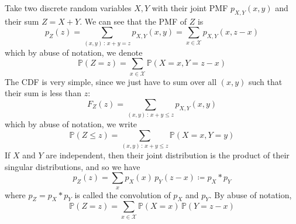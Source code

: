     \begin{definition}
      Take two discrete random variables $X, Y$ with their joint PMF $p_{X, Y} (x, y)$ and their sum $Z = X + Y$. We can see that the PMF of $Z$ is 
      \begin{equation}
        p_Z (z) = \sum_{(x, y) \,:\, x + y = z} p_{X, Y} (x, y) = \sum_{x \in \mathcal{X}} p_{X, Y} (x, z - x)
      \end{equation}
      which by abuse of notation, we denote
      \begin{equation}
        \mathbb{P}(Z = z) = \sum_{x \in \mathcal{X}} \mathbb{P}(X = x, Y = z - x)
      \end{equation}
      The CDF is very simple, since we just have to sum over all $(x, y)$ such that their sum is less than $z$: 
      \begin{equation}
        F_Z (z) = \sum_{(x, y) \,:\, x + y \leq z} p_{X, Y} (x, y)
      \end{equation}
      which by abuse of notation, we write 
      \begin{equation}
        \mathbb{P}(Z \leq z) = \sum_{(x, y) \,:\, x + y \leq z} \mathbb{P}(X = x, Y = y)
      \end{equation}
      If $X$ and $Y$ are independent, then their joint distribution is the product of their singular distributions, and so we have 
      \begin{equation}
        p_Z (z) = \sum_x p_X (x) \, p_Y (z - x) \coloneqq p_X \ast p_Y
      \end{equation}
      where $p_Z = p_X \ast p_Y$ is called the convolution of $p_X$ and $p_Y$. By abuse of notation, 
      \begin{equation}
        \mathbb{P}(Z = z) = \sum_{x \in \mathcal{X}} \mathbb{P}(X = x) \, \mathbb{P}(Y = z - x)
      \end{equation}
    \end{definition}

